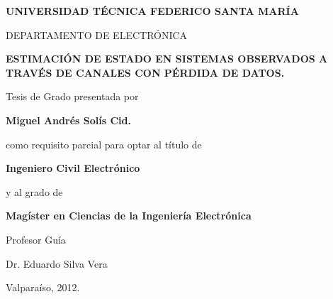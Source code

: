 \pagestyle{empty}

\begin{center}

\large \textbf{UNIVERSIDAD T\'ECNICA FEDERICO SANTA MAR\'IA}

\vspace{3mm}

\normalsize DEPARTAMENTO DE ELECTR\'ONICA

\vspace{40mm}

\Large {\bf ESTIMACI\'ON DE ESTADO EN SISTEMAS OBSERVADOS A TRAV\'ES DE CANALES CON P\'ERDIDA DE DATOS.}

\vspace{32mm}

\normalsize
Tesis de Grado presentada por

\vspace{2mm}

\large \textbf{Miguel Andr\'es Sol\'is Cid.}

\vspace{10mm}

\normalsize
como requisito parcial para optar al t\'itulo de

\vspace{2mm}

\textbf{Ingeniero Civil Electr\'onico}

\vspace{2mm}

y al grado de

\vspace{2mm}

\textbf{Mag\'ister en Ciencias de la Ingenier\'ia Electr\'onica}

\vspace{5mm}

Profesor Gu\'ia


Dr. Eduardo Silva Vera





\vspace{10mm}

Valpara\'iso, 2012.


\end{center}

